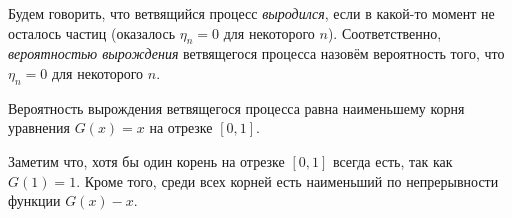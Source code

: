\documentclass[../main.tex]{subfiles}
\begin{document}
 \begin{df}
  Будем говорить, что ветвящийся процесс \textit{выродился}, если в какой-то момент не осталось частиц (оказалось $ \eta_n = 0 $ для некоторого $ n $). Соответственно, \textit{вероятностью вырождения} ветвящегося процесса назовём вероятность того, что $ \eta_n = 0 $ для некоторого $ n $.
 \end{df}

 \begin{thm}
  \label{theorem:stop_branching_process}
  Вероятность вырождения ветвящегося процесса равна наименьшему корня уравнения $ G(x) = x $ на отрезке $ [0,1] $.
 \end{thm}

 Заметим что, хотя бы один корень на отрезке $ [0,1] $ всегда есть, так как $ G(1) = 1 $. Кроме того, среди всех корней есть наименьший по непрерывности функции $ G(x)-x $.
\end{document}
